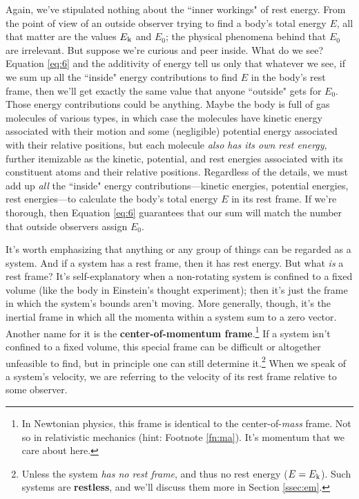 \documentclass[12pt]{article}
\begin{document}
Again, we've stipulated nothing about the ``inner workings" of rest energy. From the point of view of an outside observer trying to find a body's total energy $E$, all that matter are the values $E_{\mkern.5mu \textrm{k}}$ and $E_0$; the physical phenomena behind that $E_0$ are irrelevant. But suppose we're curious and peer inside. What do we see? Equation \ref{eq:6} and the additivity of energy tell us only that whatever we see, if we sum up all the ``inside" energy contributions to find $E$ in the body's rest frame, then we'll get exactly the same value that anyone ``outside" gets for $E_0$. Those energy contributions could be anything. Maybe the body is full of gas molecules of various types, in which case the molecules have kinetic energy associated with their motion and some (negligible) potential energy associated with their relative positions, but each molecule \emph{also has its own rest energy}, further itemizable as the kinetic, potential, and rest energies associated with its constituent atoms and their relative positions. Regardless of the details, we must add up \emph{all} the ``inside" energy contributions---kinetic energies, potential energies, rest energies---to calculate the body's total energy $E$ in its rest frame. If we're thorough, then Equation \ref{eq:6} guarantees that our sum will match the number that outside observers assign $E_0$.

It's worth emphasizing that anything or any group of things can be regarded as a system. And if a system has a rest frame, then it has rest energy. But what \emph{is} a rest frame? It's self-explanatory when a non-rotating system is confined to a fixed volume (like the body in Einstein's thought experiment); then it's just the frame in which the system's bounds aren't moving. More generally, though, it's the inertial frame in which all the momenta within a system sum to a zero vector. Another name for it is the \textbf{center-of-momentum frame}.\footnote{In Newtonian physics, this frame is identical to the center-of-\emph{mass} frame. Not so in relativistic mechanics (hint: Footnote \ref{fn:ma}). It's momentum that we care about here.} If a system isn't confined to a fixed volume, this special frame can be difficult or altogether unfeasible to find, but in principle one can still determine it.\footnote{\label{fn:rl}Unless the system \emph{has no rest frame}, and thus no rest energy ($E = E_{\mkern.5mu \textrm{k}}$). Such systems are \textbf{restless}, and we'll discuss them more in Section \ref{ssec:em}.} When we speak of a system's velocity, we are referring to the velocity of its rest frame relative to some observer.
\end{document}
